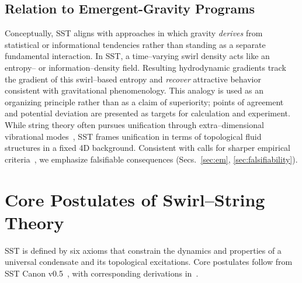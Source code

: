 \documentclass[10pt,reprint,aps,onecolumn,nofootinbib]{revtex4-2}
\begin{document}
        \subsection*{Relation to Emergent-Gravity Programs}
            Conceptually, SST aligns with approaches in which gravity \emph{derives} from statistical or informational tendencies rather than standing as a separate fundamental interaction. In SST, a time–varying swirl density acts like an entropy– or information–density field. Resulting hydrodynamic gradients track the gradient of this swirl–based entropy and \emph{recover} attractive behavior consistent with gravitational phenomenology. This analogy is used as an organizing principle rather than as a claim of superiority; points of agreement and potential deviation are presented as targets for calculation and experiment. While string theory often pursues unification through extra–dimensional vibrational modes~\cite{Susskind2003}, SST frames unification in terms of topological fluid structures in a fixed 4D background. Consistent with calls for sharper empirical criteria~\cite{Hossenfelder2018}, we emphasize falsifiable consequences (Secs.~\ref{sec:em}, \ref{sec:falsifiability}).


    \section{Core Postulates of Swirl–String Theory}\label{sec:postulates}
        SST is defined by six axioms that constrain the dynamics and properties of a universal condensate and its topological excitations. Core postulates follow from SST Canon v0.5~\cite{sstCanon}, with corresponding derivations in~\cite{sstLagrangian}.
\end{document}

